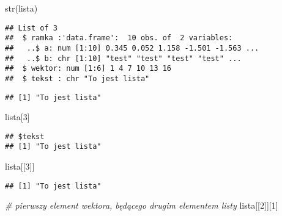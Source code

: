 \documentclass[
]{book}
\newenvironment{Shaded}{\begin{snugshade}}{\end{snugshade}}
\newcommand{\CommentTok}[1]{\textcolor[rgb]{0.56,0.35,0.01}{\textit{#1}}}
\newcommand{\DecValTok}[1]{\textcolor[rgb]{0.00,0.00,0.81}{#1}}
\newcommand{\FunctionTok}[1]{\textcolor[rgb]{0.00,0.00,0.00}{#1}}
\newcommand{\NormalTok}[1]{#1}
\newcommand{\SpecialCharTok}[1]{\textcolor[rgb]{0.00,0.00,0.00}{#1}}
\begin{document}
\begin{Shaded}
\begin{Highlighting}[]
\FunctionTok{str}\NormalTok{(lista)}
\end{Highlighting}
\end{Shaded}

\begin{verbatim}
## List of 3
##  $ ramka :'data.frame':  10 obs. of  2 variables:
##   ..$ a: num [1:10] 0.345 0.052 1.158 -1.501 -1.563 ...
##   ..$ b: chr [1:10] "test" "test" "test" "test" ...
##  $ wektor: num [1:6] 1 4 7 10 13 16
##  $ tekst : chr "To jest lista"
\end{verbatim}

\begin{Shaded}
\end{Shaded}

\begin{verbatim}
## [1] "To jest lista"
\end{verbatim}

\begin{Shaded}
\begin{Highlighting}[]
\NormalTok{lista[}\DecValTok{3}\NormalTok{]}
\end{Highlighting}
\end{Shaded}

\begin{verbatim}
## $tekst
## [1] "To jest lista"
\end{verbatim}

\begin{Shaded}
\begin{Highlighting}[]
\NormalTok{lista[[}\DecValTok{3}\NormalTok{]]}
\end{Highlighting}
\end{Shaded}

\begin{verbatim}
## [1] "To jest lista"
\end{verbatim}

\begin{Shaded}
\begin{Highlighting}[]
\CommentTok{\# pierwszy element wektora, będącego drugim elementem listy}
\NormalTok{lista[[}\DecValTok{2}\NormalTok{]][}\DecValTok{1}\NormalTok{]}
\end{Highlighting}
\end{Shaded}
\end{document}
